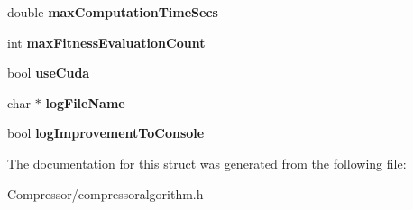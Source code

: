 \begin{DoxyCompactItemize}
\item 
double {\bfseries max\+Computation\+Time\+Secs}\hypertarget{structlossycompressor_1_1_compressor_algorithm_args_ae9daf7684e8ad2d5783c02d942fdbc62}{}\label{structlossycompressor_1_1_compressor_algorithm_args_ae9daf7684e8ad2d5783c02d942fdbc62}

\item 
int {\bfseries max\+Fitness\+Evaluation\+Count}\hypertarget{structlossycompressor_1_1_compressor_algorithm_args_a3bc23ff31a585b32b455f13b9584ca2c}{}\label{structlossycompressor_1_1_compressor_algorithm_args_a3bc23ff31a585b32b455f13b9584ca2c}

\item 
bool {\bfseries use\+Cuda}\hypertarget{structlossycompressor_1_1_compressor_algorithm_args_a19e2e50f7275d3a365d8d14a74a7383b}{}\label{structlossycompressor_1_1_compressor_algorithm_args_a19e2e50f7275d3a365d8d14a74a7383b}

\item 
char $\ast$ {\bfseries log\+File\+Name}\hypertarget{structlossycompressor_1_1_compressor_algorithm_args_a573ef995fb90d039888bdb88ee97ba7b}{}\label{structlossycompressor_1_1_compressor_algorithm_args_a573ef995fb90d039888bdb88ee97ba7b}

\item 
bool {\bfseries log\+Improvement\+To\+Console}\hypertarget{structlossycompressor_1_1_compressor_algorithm_args_a3f9e98106776f5186e53c163e13fb301}{}\label{structlossycompressor_1_1_compressor_algorithm_args_a3f9e98106776f5186e53c163e13fb301}

\end{DoxyCompactItemize}


The documentation for this struct was generated from the following file\+:\begin{DoxyCompactItemize}
\item 
Compressor/compressoralgorithm.\+h\end{DoxyCompactItemize}
